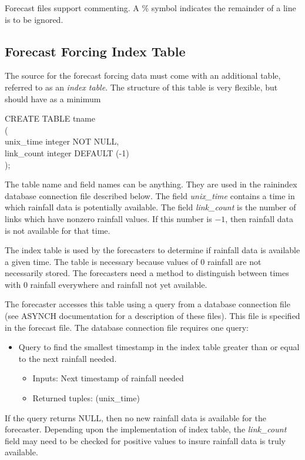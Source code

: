 \documentclass[12pt]{article}
\newenvironment{codeindent}
{\begin{list}{}
        {\setlength{\leftmargin}{.1in}}
        \item[]
}
{\end{list}}
\begin{document}
Forecast files support commenting. A \% symbol indicates the remainder of a line is to be ignored.

\subsection{Forecast Forcing Index Table} \label{sec: forecast forcing index table}

The source for the forecast forcing data must come with an additional table, referred to as an \emph{index table}. The structure of this table is very flexible, but should have as a minimum
\begin{codeindent}
CREATE TABLE tname \\
( \\
  unix\_time integer NOT NULL, \\
  link\_count integer DEFAULT (-1) \\
);
\end{codeindent}
The table name and field names can be anything. They are used in the rainindex database connection file described below. The field \emph{unix\_time} contains a time in which rainfall data is potentially available. The field \emph{link\_count} is the number of links which have nonzero rainfall values. If this number is $-1$, then rainfall data is not available for that time.

The index table is used by the forecasters to determine if rainfall data is available a given time. The table is necessary because values of 0 rainfall are not necessarily stored. The forecasters need a method to distinguish between times with 0 rainfall everywhere and rainfall not yet available.

The forecaster accesses this table using a query from a database connection file (see ASYNCH documentation for a description of these files). This file is specified in the forecast file. The database connection file requires one query:
\begin{itemize}
 \item Query to find the smallest timestamp in the index table greater than or equal to the next rainfall needed.
  \begin{itemize}
   \item Inputs: Next timestamp of rainfall needed
   \item Returned tuples: (unix\_time)
  \end{itemize}
\end{itemize}
If the query returns NULL, then no new rainfall data is available for the forecaster. Depending upon the implementation of index table, the \emph{link\_count} field may need to be checked for positive values to insure rainfall data is truly available.
\end{document}
